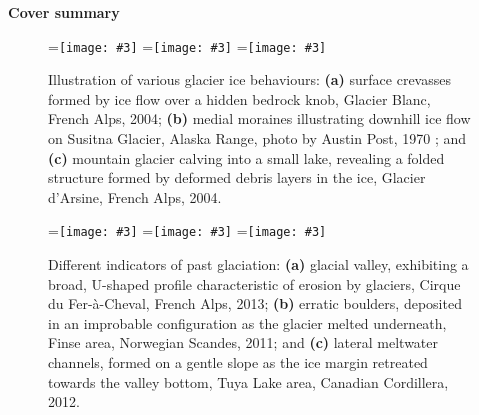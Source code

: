 \documentclass[a4paper]{kappa}
\newcommand{\subgraphics}[3][,]{%
  \setbox1=\hbox{\texttt{[image: \#3]}}%
  \leavevmode\rlap{\usebox1}%
  \rlap{\hspace*{0.25em}
        \raisebox{\dimexpr\ht1-3ex}{\textbf{(#2)}}}%
  \phantom{\usebox1}%
}
\begin{document}
\onecolumn

\hfill \textbf{\huge Cover summary}
\vfill
\tableofcontents

\newpage

\begin{figure}[b]
  \subgraphics{a}{photo-glacier-crevasses}%
  \hspace{1cm}%
  \subgraphics{b}{photo-glacier-susitna}%
  \hspace{1cm}%
  \subgraphics{c}{photo-glacier-fold}%
  \caption{Illustration of various glacier ice behaviours:
           \textbf{(a)} surface crevasses formed by ice flow over a hidden
           bedrock knob, Glacier Blanc, French Alps, 2004;
           \textbf{(b)} medial moraines illustrating downhill ice flow on
           Susitna Glacier, Alaska Range, photo by Austin Post, 1970
           \citep{NSIDC.2009}; and
           \textbf{(c)} mountain glacier calving into a small lake, revealing a
           folded structure formed by deformed debris layers in the ice,
           Glacier d'Arsine, French Alps, 2004.}
  \label{fig:glacier-mechanics}
\end{figure}

\begin{figure}[b]
  \subgraphics{a}{photo-glacial-valley}%
  \hspace{1cm}%
  \subgraphics{b}{photo-erratic-boulder}%
  \hspace{1cm}%
  \subgraphics{c}{photo-melt-channels}%
  \caption{Different indicators of past glaciation:
           \textbf{(a)} glacial valley, exhibiting a broad, U-shaped profile
           characteristic of erosion by glaciers,
           Cirque du Fer-\`{a}-Cheval, French Alps, 2013;
           \textbf{(b)} erratic boulders, deposited in an improbable
           configuration as the glacier melted underneath,
           Finse area, Norwegian Scandes, 2011; and
           \textbf{(c)} lateral meltwater channels, formed on a gentle slope
           as the ice margin retreated towards the valley bottom, Tuya Lake
           area, Canadian Cordillera, 2012.}
  \label{fig:glaciation-indicators}
\end{figure}
\end{document}
